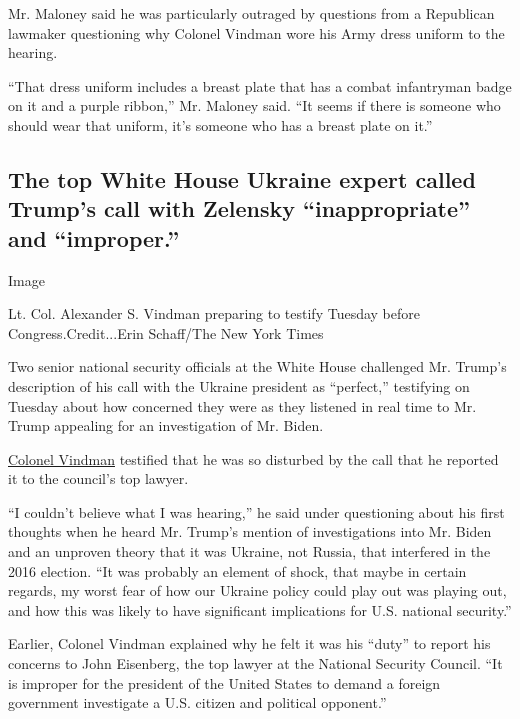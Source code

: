 Mr. Maloney said he was particularly outraged by questions from a
Republican lawmaker questioning why Colonel Vindman wore his Army dress
uniform to the hearing.

``That dress uniform includes a breast plate that has a combat
infantryman badge on it and a purple ribbon,'' Mr. Maloney said. ``It
seems if there is someone who should wear that uniform, it's someone who
has a breast plate on it.''

\hypertarget{the-top-white-house-ukraine-expert-called-trumps-call-with-zelensky-inappropriate-and-improper}{%
\subsection{The top White House Ukraine expert called Trump's call with
Zelensky ``inappropriate'' and
``improper.''}\label{the-top-white-house-ukraine-expert-called-trumps-call-with-zelensky-inappropriate-and-improper}}

Image

Lt. Col. Alexander S. Vindman preparing to testify Tuesday before
Congress.Credit...Erin Schaff/The New York Times

Two senior national security officials at the White House challenged Mr.
Trump's description of his call with the Ukraine president as
``perfect,'' testifying on Tuesday about how concerned they were as they
listened in real time to Mr. Trump appealing for an investigation of Mr.
Biden.

\href{https://www.nytimes.com/2019/11/19/us/alexander-vindman.html}{Colonel
Vindman} testified that he was so disturbed by the call that he reported
it to the council's top lawyer.

``I couldn't believe what I was hearing,'' he said under questioning
about his first thoughts when he heard Mr. Trump's mention of
investigations into Mr. Biden and an unproven theory that it was
Ukraine, not Russia, that interfered in the 2016 election. ``It was
probably an element of shock, that maybe in certain regards, my worst
fear of how our Ukraine policy could play out was playing out, and how
this was likely to have significant implications for U.S. national
security.''

Earlier, Colonel Vindman explained why he felt it was his ``duty'' to
report his concerns to John Eisenberg, the top lawyer at the National
Security Council. ``It is improper for the president of the United
States to demand a foreign government investigate a U.S. citizen and
political opponent.''

